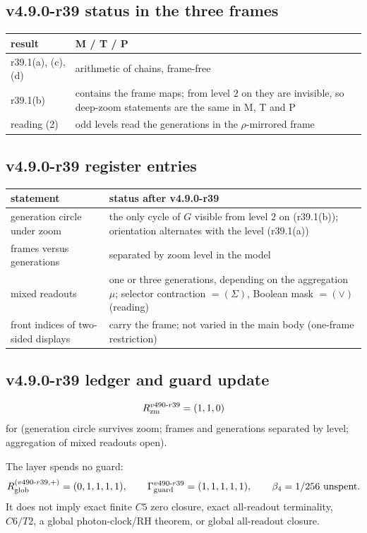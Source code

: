 \subsection*{v4.9.0-r39 status in the three frames}
\label{subsec:v490-r39-frames}

\begin{center}
\small
\begin{tabular}{@{}>{\raggedright\arraybackslash}p{}>{\raggedright\arraybackslash}p{}@{}}
\toprule
result & M / T / P\\
\midrule
r39.1(a), (c), (d) & arithmetic of chains, frame-free\\
r39.1(b) & contains the frame maps; from level \(2\) on they are invisible, so deep-zoom statements are the same in M, T and P\\
reading (2) & odd levels read the generations in the \(\rho\)-mirrored frame\\
\bottomrule
\end{tabular}
\end{center}

\subsection*{v4.9.0-r39 register entries}
\label{subsec:v490-r39-register}

\begin{center}
\small
\begin{tabular}{@{}>{\raggedright\arraybackslash}p{}>{\raggedright\arraybackslash}p{}@{}}
\toprule
statement & status after v4.9.0-r39\\
\midrule
generation circle under zoom & the only cycle of \(G\) visible from level \(2\) on (r39.1(b)); orientation alternates with the level (r39.1(a))\\
frames versus generations & separated by zoom level in the model\\
mixed readouts & one or three generations, depending on the aggregation \(\mu\); selector contraction \(=(\Sigma)\), Boolean mask \(=(\vee)\) (reading)\\
front indices of two-sided displays & carry the frame; not varied in the main body (one-frame restriction)\\
\bottomrule
\end{tabular}
\end{center}

\subsection*{v4.9.0-r39 ledger and guard update}
\label{subsec:v490-r39-ledger-guard}

\[
R_{\rm zm}^{v490\text{-}r39}=(1,1,0)
\]
for (generation circle survives zoom; frames and generations separated by level; aggregation of mixed readouts open).

The layer spends no guard:
\[
R_{\rm glob}^{(v490\text{-}r39,+)}=(0,1,1,1,1),
\qquad
\Gamma_{\rm guard}^{v490\text{-}r39}=(1,1,1,1,1),
\qquad
\beta_4=1/256\ \text{unspent}.
\]
It does not imply exact finite \(C5\) zero closure, exact all-readout terminality,
\(C6/T2\), a global photon-clock/RH theorem, or global all-readout closure.

